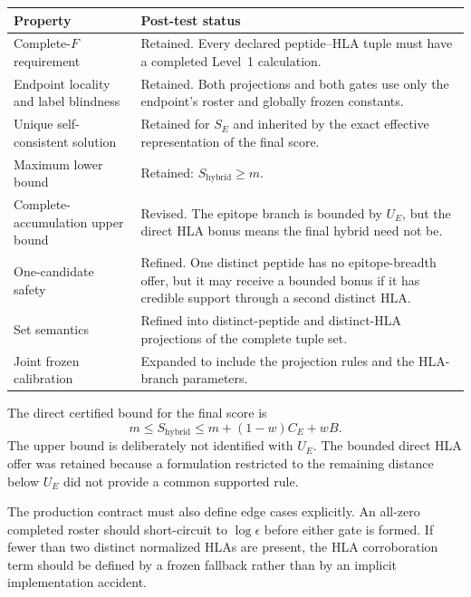 \documentclass[11pt]{article}
\begin{document}
\begin{center}
\small
\begin{tabularx}{0.96\textwidth}{@{}p{}>{\raggedright\arraybackslash}X@{}}
\toprule
Property & Post-test status \\
\midrule
Complete-$F$ requirement
& Retained. Every declared peptide--HLA tuple must have a completed Level~1
calculation. \\
Endpoint locality and label blindness
& Retained. Both projections and both gates use only the endpoint's roster
and globally frozen constants. \\
Unique self-consistent solution
& Retained for $S_E$ and inherited by the exact effective representation of the
final score. \\
Maximum lower bound
& Retained: $S_{\mathrm{hybrid}}\geq m$. \\
Complete-accumulation upper bound
& Revised. The epitope branch is bounded by $U_E$, but the direct HLA bonus
means the final hybrid need not be. \\
One-candidate safety
& Refined. One distinct peptide has no epitope-breadth offer, but it may
receive a bounded bonus if it has credible support through a second distinct
HLA. \\
Set semantics
& Refined into distinct-peptide and distinct-HLA projections of the complete
tuple set. \\
Joint frozen calibration
& Expanded to include the projection rules and the HLA-branch parameters. \\
\bottomrule
\end{tabularx}
\end{center}

The direct certified bound for the final score is
\begin{equation}
m\leq S_{\mathrm{hybrid}}
\leq m+(1-w)C_E+wB.
\label{eq:posttest-hybrid-bounds}
\end{equation}
The upper bound is deliberately not identified with $U_E$. The bounded direct
HLA offer was retained because a formulation restricted to the remaining
distance below $U_E$ did not provide a common supported rule.

The production contract must also define edge cases explicitly. An all-zero
completed roster should short-circuit to $\log\epsilon$ before either gate is
formed. If fewer than two distinct normalized HLAs are present, the HLA
corroboration term should be defined by a frozen fallback rather than by an
implicit implementation accident.
\end{document}
